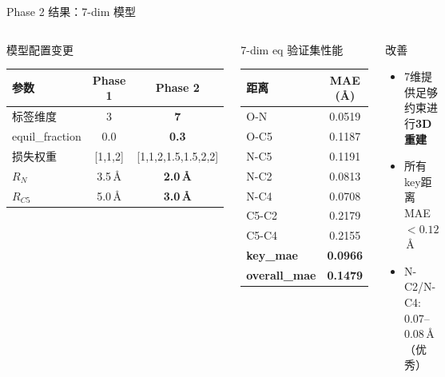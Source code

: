 \documentclass[aspectratio=169,9pt]{beamer}
\begin{document}
\begin{frame}{Phase 2 结果：7-dim 模型}
  \begin{columns}[T]
    \begin{block}{模型配置变更}
      \scriptsize
      \begin{tabular}{@{}lcc@{}}
        \toprule
        参数 & Phase 1 & Phase 2 \\
        \midrule
        标签维度 & 3 & \textbf{7} \\
        equil\_fraction & 0.0 & \textbf{0.3} \\
        损失权重 & [1,1,2] & [1,1,2,1.5,1.5,2,2] \\
        $R_N$ & 3.5\,\AA & \textbf{2.0\,\AA} \\
        $R_{C5}$ & 5.0\,\AA & \textbf{3.0\,\AA} \\
        \bottomrule
      \end{tabular}
    \end{block}

    \begin{exampleblock}{7-dim eq 验证集性能}
      \scriptsize
      \begin{tabular}{@{}lc@{}}
        \toprule
        距离 & MAE (\AA) \\
        \midrule
        O-N & 0.0519 \\
        O-C5 & 0.1187 \\
        N-C5 & 0.1191 \\
        N-C2 & 0.0813 \\
        N-C4 & 0.0708 \\
        C5-C2 & 0.2179 \\
        C5-C4 & 0.2155 \\
        \midrule
        \textbf{key\_mae} & \textbf{0.0966} \\
        \textbf{overall\_mae} & \textbf{0.1479} \\
        \bottomrule
      \end{tabular}
    \end{exampleblock}

    \begin{block}{改善}
      \scriptsize
      \begin{itemize}
        \item 7维提供足够约束进行\textbf{3D重建}
        \item 所有key距离MAE $< 0.12$\,\AA
        \item N-C2/N-C4: 0.07--0.08\,\AA（优秀）
      \end{itemize}
    \end{block}


\end{columns}
\end{frame}
\end{document}
